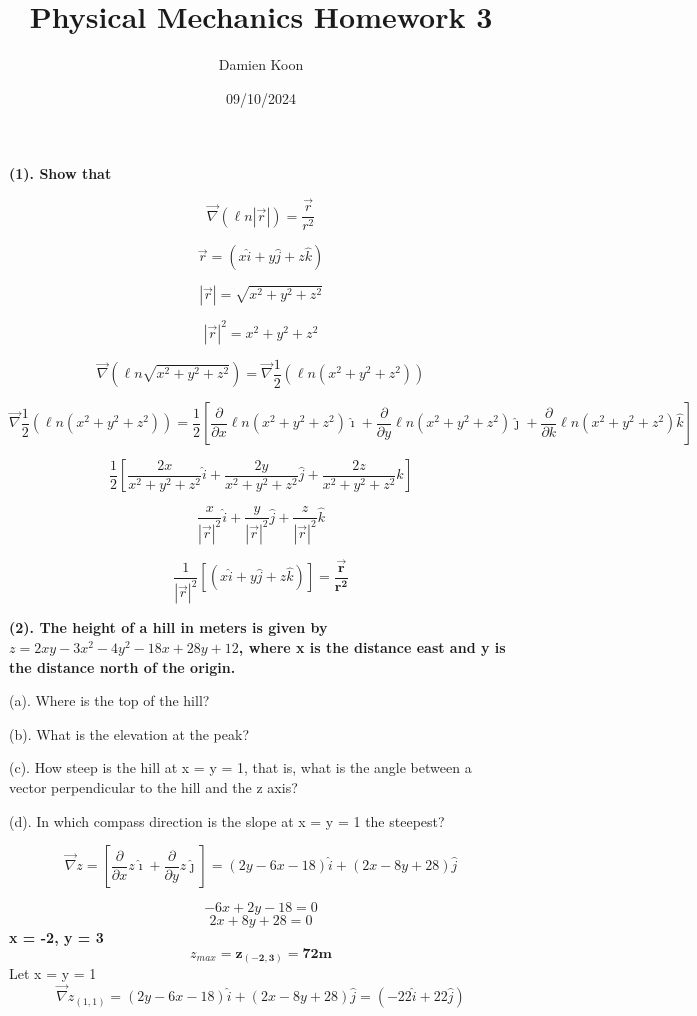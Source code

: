 \documentclass[12pt]{article}
\title{Physical Mechanics Homework 3}
\date{09/10/2024}
\author{Damien Koon}
\begin{document}
\maketitle

\newpage
\textbf{
(1). Show that
}

$$
\vec{\nabla}(\ell n |\vec{r}|) = \frac{\vec{r}}{r^2}
$$

$$
\vec{r} = (x\hat{i} + y\hat{j} + z\hat{k}) 
$$

$$
|\vec{r}| = \sqrt{x^2 + y^2 + z^2} 
$$

$$
|\vec{r}|^2 = x^2 + y^2 + z^2
$$

$$
\vec{\nabla}(\ell n \sqrt{x^2 + y^2 + z^2} ) = \vec{\nabla}\frac{1}{2}(\ell n (x^2 + y^2 + z^2))
$$

$$
\vec{\nabla}\frac{1}{2}(\ell n (x^2 + y^2 + z^2)) = \frac{1}{2}[\frac{\partial }{\partial x}\ell n (x^2 + y^2 + z^2)\hat{\imath} + \frac{\partial }{\partial y}\ell n (x^2 + y^2 + z^2)\hat{\jmath} +\frac{\partial }{\partial k}\ell n (x^2 + y^2 + z^2)\hat{k}]
$$

$$
\frac{1}{2}[\frac{2x}{x^2 + y^2 + z^2}\hat{i} + \frac{2y}{x^2 + y^2 + z^2}\hat{j} + \frac{2z}{x^2 + y^2 + z^2}\hat{k}]
$$

$$
\frac{x}{|\vec{r}|^2}\hat{i} + \frac{y}{|\vec{r}|^2}\hat{j} + \frac{z}{|\vec{r}|^2}\hat{k}
$$

$$
\frac{1}{|\vec{r}|^2}[(x\hat{i} + y\hat{j} + z\hat{k})] = \boldsymbol{\frac{\vec{r}}{r^2}}
$$

\newpage
\textbf{
(2). The height of a hill in meters is given by $z = 2xy  - 3x^2  - 4y^2  - 18x +
28y + 12$, where x is the distance east and y is the distance north of the origin.
}
\hfill \break

(a). Where is the top of the hill?

(b). What is the elevation at the peak?

(c). How steep is the hill at x = y = 1, that is, what is the angle between a vector
perpendicular to the hill and the z axis?

(d). In which compass direction is the slope at x = y = 1 the steepest?

$$
\vec{\nabla}z = [\frac{\partial }{\partial x}z\hat{\imath} + \frac{\partial }{\partial y}z\hat{\jmath}] = (2y - 6x - 18)\hat{i} + (2x-8y+28)\hat{j}
$$

$$
-6x + 2y - 18 = 0
$$
$$
2x + 8y + 28 = 0
$$
\textbf{x = -2, y = 3}
$$
z_{max} = \boldsymbol{z_{(-2, 3)} = 72m}
$$
Let x = y = 1
$$
\vec{\nabla}z_{(1,1)} = (2y - 6x - 18)\hat{i} + (2x-8y+28)\hat{j} = (-22\hat{i} + 22\hat{j})
$$
\end{document}
